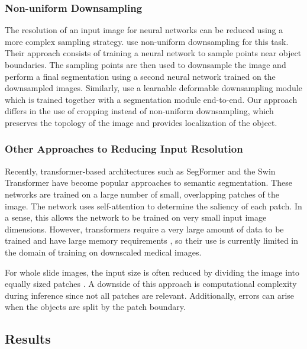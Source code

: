 \subsubsection{Non-uniform Downsampling}

The resolution of an input image for neural networks can be reduced using a more complex sampling strategy. \citet{marinEfficientSegmentationLearning2019} use non-uniform downsampling for this task. Their approach consists of training a neural network to sample points near object boundaries. The sampling points are then used to downsample the image and perform a final segmentation using a second neural network trained on the downsampled images. Similarly, \citet{jin2022learning} use a learnable deformable downsampling module which is trained together with a segmentation module end-to-end. Our approach differs in the use of cropping instead of non-uniform downsampling, which preserves the topology of the image and provides localization of the object.

\subsubsection{Other Approaches to Reducing Input Resolution}

Recently, transformer-based architectures such as SegFormer \cite{xie2021segformer} and the Swin Transformer \cite{liu2021Swin} have become popular approaches to semantic segmentation. These networks are trained on a large number of small, overlapping patches of the image. The network uses self-attention to determine the saliency of each patch. In a sense, this allows the network to be trained on very small input image dimensions. However, transformers require a very large amount of data to be trained and have large memory requirements \cite{dosovitskiy2020vit}, so their use is currently limited in the domain of training on downscaled medical images.

For whole slide images, the input size is often reduced by dividing the image into equally sized patches \cite{nazeriTwoStageConvolutionalNeural2018, houPatchBasedConvolutionalNeural2016}. A downside of this approach is computational complexity during inference since not all patches are relevant. Additionally, errors can arise when the objects are split by the patch boundary.

\subsection{Results}

